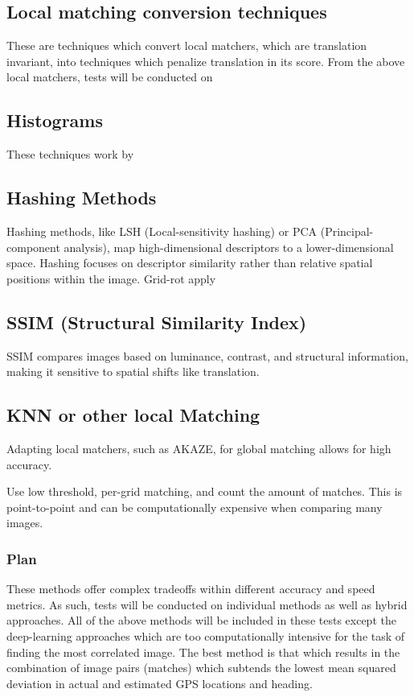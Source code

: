 \subsection*{Local matching conversion techniques}
These are techniques which convert local matchers, which are translation invariant, into techniques which penalize translation in its score. From the above local matchers, tests will be conducted on 

\subsection*{Histograms}
These techniques work by 

\subsection*{Hashing Methods}  
Hashing methods, like LSH (Local-sensitivity hashing) or PCA (Principal-component analysis), map high-dimensional descriptors to a lower-dimensional space. Hashing focuses on descriptor similarity rather than relative spatial positions within the image. Grid-rot apply

\subsection*{SSIM (Structural Similarity Index)}  
SSIM compares images based on luminance, contrast, and structural information, making it sensitive to spatial shifts like translation. 

\subsection*{KNN or other local Matching}  
Adapting local matchers, such as AKAZE, for global matching allows for high accuracy. 

Use low threshold, per-grid matching, and count the amount of matches. This is point-to-point and can be computationally expensive when comparing many images. 



\subsubsection*{Plan}
These methods offer complex tradeoffs within different accuracy and speed metrics. As such, tests will be conducted on individual methods as well as hybrid approaches. All of the above methods will be included in these tests except the deep-learning approaches which are too computationally intensive for the task of finding the most correlated image. The best method is that which results in the combination of image pairs (matches) which subtends the lowest mean squared deviation in actual and estimated GPS locations and heading. 


